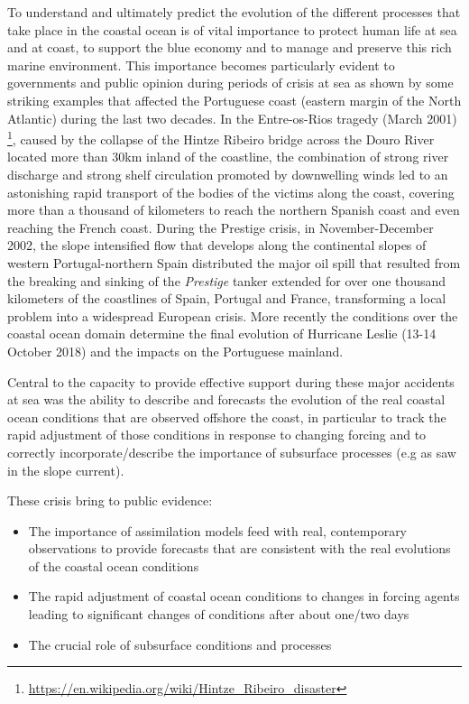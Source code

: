 To understand and ultimately predict the evolution of the different
processes that take place in the coastal ocean is of vital importance
to protect human life at sea and at coast, to support the blue economy
and to manage and preserve this rich marine environment. This
importance becomes particularly evident to governments and public
opinion during periods of crisis at sea as shown by some striking
examples that affected the Portuguese coast (eastern margin of the
North Atlantic) during the last two decades. In the Entre-os-Rios
tragedy (March 2001)
\footnote{\url{https://en.wikipedia.org/wiki/Hintze_Ribeiro_disaster}},
caused by the collapse of the Hintze Ribeiro bridge across the Douro
River located more than 30km inland of the coastline, the combination
of strong river discharge and strong shelf circulation promoted by
downwelling winds led to an astonishing rapid transport of the bodies
of the victims along the coast, covering more than a thousand of
kilometers to reach the northern Spanish coast and even reaching the
French coast. During the Prestige crisis, in November-December 2002,
the slope intensified flow that develops along the continental slopes
of western Portugal-northern Spain distributed the major oil spill
that resulted from the breaking and sinking of the \emph{Prestige}
tanker extended for over one thousand kilometers of the coastlines of
Spain, Portugal and France, transforming a local problem into a
widespread European crisis. More recently the conditions over the
coastal ocean domain determine the final evolution of Hurricane Leslie
(13-14 October 2018) and the impacts on the Portuguese mainland.
 
Central to the capacity to provide effective support during these major
accidents at sea was the ability to describe and forecasts the evolution
of the real coastal ocean conditions that are observed offshore the
coast, in particular to track the rapid adjustment of those conditions
in response to changing forcing and to correctly incorporate/describe
the importance of subsurface processes (e.g as saw in the slope
current).
 
These crisis bring to public evidence:

\begin{itemize}
  
\item The importance of assimilation models feed with real, contemporary
  observations to provide forecasts that are consistent with the real
  evolutions of the coastal ocean conditions

\item The rapid adjustment of coastal ocean conditions to changes in
  forcing agents leading to significant changes of conditions after
  about one/two days

\item The crucial role of subsurface conditions and processes
 
\end{itemize}

